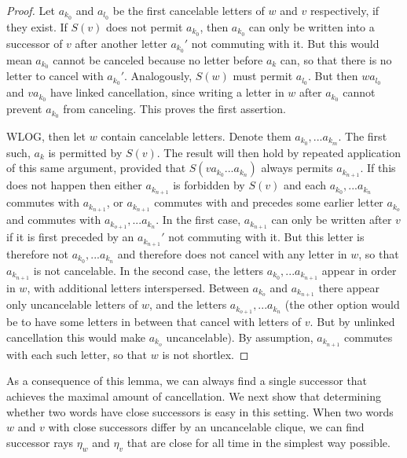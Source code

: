 \documentclass[10pt,a4paper]{amsart}
\theoremstyle{definition}
\theoremstyle{remark}
\begin{document}
	\begin{proof}
		
		Let $a_{k_0}$ and $a_{l_0}$ be the first cancelable letters of $w$ and $v$ respectively, if they exist. If $S(v)$ does not permit $a_{k_0}$, then  $a_{k_0}$ can only be written into a successor of $v$ after another letter $a_{k_0}'$ not commuting with it. But this would mean $a_{k_0}$ cannot be canceled because no letter before $a_k$ can, so that there is no letter to cancel with $a_{k_0}'$. Analogously, $S(w)$ must permit $a_{l_0}$. But then $wa_{l_0}$ and $va_{k_0}$ have linked cancellation, since writing a letter in $w$ after $a_{k_0}$ cannot prevent $a_{k_0}$ from canceling. This proves the first assertion.
		
		WLOG, then let $w$ contain cancelable letters. Denote them $a_{k_0}, ... a_{k_m}$. The first such, $a_k$ is permitted by $S(v)$. The result will then hold by repeated application of this same argument, provided that $S(va_{k_0} ... a_{k_n})$ always permits $a_{k_{n+1}}$. If this does not happen then either $a_{k_{n+1}}$ is forbidden by $S(v)$ and each $a_{k_0}, ... a_{k_n}$ commutes with $a_{k_{n+1}}$, or $a_{k_{n+1}}$ commutes with and precedes some earlier letter $a_{k_o}$ and commutes with $a_{k_{o+1}}, ... a_{k_n}$. In the first case, $a_{k_{n+1}}$ can only be written after $v$ if it is first preceded by an $a_{k_{n+1}}'$ not commuting with it. But this letter is therefore not $a_{k_0}, ... a_{k_n}$ and therefore does not cancel with any letter in $w$, so that $a_{k_{n+1}}$ is not cancelable. In the second case, the letters $a_{k_0}, ... a_{k_{n+1}}$ appear in order in $w$, with additional letters interspersed. Between $a_{k_{o}}$ and $a_{k_{n+1}}$ there appear only uncancelable letters of $w$, and the letters $a_{k_{o+1}}, ... a_{k_n}$ (the other option would be to have some letters in between that cancel with letters of $v$. But by unlinked cancellation this would make $a_{k_o}$ uncancelable). By assumption, $a_{k_{n+1}}$ commutes with each such letter, so that $w$ is not shortlex.
	\end{proof}
	
	As a consequence of this lemma, we can always find a single successor that achieves the maximal amount of cancellation. We next show that determining whether two words have close successors is easy in this setting. When two words $w$ and $v$ with close successors differ by an uncancelable clique, we can find successor rays $\eta_w$ and $\eta_v$ that are close for all time in the simplest way possible.
	
\end{document}
